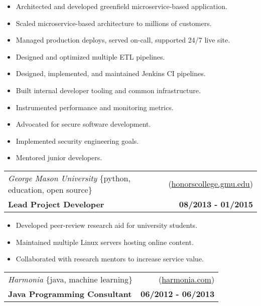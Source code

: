 \documentclass[10pt,letterpaper]{article}
\newenvironment{details}
{\begin{itemize}}
{\end{itemize}}
\begin{document}
\begin{details}
\item Architected and developed greenfield microservice-based application.
\item Scaled microservice-based architecture to millions of customers.
\item Managed production deploys, served on-call, supported 24/7 live site.
\item Designed and optimized multiple ETL pipelines.
\item Designed, implemented, and maintained Jenkins CI pipelines.
\item Built internal developer tooling and common infrastructure.
\item Instrumented performance and monitoring metrics.
\item Advocated for secure software development.
\item Implemented security engineering goals.
\item Mentored junior developers.
\end{details}

\vspace{0.25cm}

\noindent\begin{tabularx}{\textwidth}{@{}X r@{}}
  \textit{George Mason University} \{python, education, open source\} & (\href{https://honorscollege.gmu.edu/collegeresearch}{honorscollege.gmu.edu}) \\
  \textbf{Lead Project Developer} & \textbf{08/2013 - 01/2015}
\end{tabularx}

\begin{details}
\item Developed peer-review research aid for university students.
\item Maintained multiple Linux servers hosting online content.
\item Collaborated with research mentors to increase service value.
\end{details}

\vspace{0.25cm}

\noindent\begin{tabularx}{\textwidth}{@{}X r@{}}
  \textit{Harmonia} \{java, machine learning\} & (\href{https://harmonia.com}{harmonia.com}) \\
  \textbf{Java Programming Consultant} & \textbf{06/2012 - 06/2013}
\end{tabularx}
\end{document}
